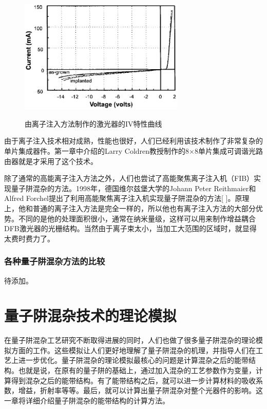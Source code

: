 \documentclass[oneside]{ZJUthesis}
\begin{document}
\begin{figure}[!h]
  \centering
  \includegraphics[width=0.7\textwidth]{./Pictures/implantation_laser.eps}\\
  \caption{由离子注入方法制作的激光器的IV特性曲线}
  \label{fig_implantation_laser}
\end{figure}

由于离子注入技术相对成熟，性能也很好，人们已经利用该技术制作了非常复杂的单片集成器件。第一章中介绍的Larry Coldren教授制作的8×8单片集成可调谐光路由器就是才采用了这个技术。

除了通常的高能离子注入方法之外，人们也尝试了高能聚焦离子注入机（FIB）实现量子阱混杂的方法。1998年，德国维尔兹堡大学的Johann Peter Reithmaier和Alfred Forchel提出了利用高能聚焦离子注入机实现量子阱混杂的方法[ ]。原理上，他和普通的离子注入方法是完全一样的，所以他也有离子注入方法的大部分优势。不同的是他的处理面积很小，通常在纳米量级，这样可以用来制作增益耦合DFB激光器的光栅结构。当然由于离子束太小，当加工大范围的区域时，就显得太费时费力了。

\subsection{各种量子阱混杂方法的比较}

待添加。

\chapter{量子阱混杂技术的理论模拟}

在量子阱混杂工艺研究不断取得进展的同时，人们也做了很多量子阱混杂的理论模拟方面的工作。这些模拟让人们更好地理解了量子阱混杂的机理，并指导人们在工艺上进一步优化。量子阱混杂的理论模拟最核心的问题是计算混杂之后的能带结构。也就是说，在原有的量子阱的基础上，通过加入混杂的工艺参数作为变量，计算得到混杂之后的能带结构。有了能带结构之后，就可以进一步计算材料的吸收系数，增益，折射率等等。最后，就可以计算出量子阱混杂对整个光器件的影响。这一章将详细介绍量子阱混杂的能带结构的计算方法。
\end{document}
